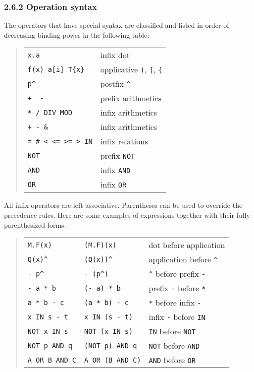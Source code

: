 \documentclass[10pt]{article}
\begin{document}
\subsubsection*{2.6.2 Operation syntax}

The operators that have special syntax are classified and listed in order of
decreasing binding power in the following table:
\begin{quote}
  \begin{tabular}{ll}
    \verb|x.a|               &    infix dot \\
    \verb|f(x) a[i] T{x}|    &    applicative \verb|(|, \verb|[|, \verb|{| \\
    \verb|p^|                &    postfix \verb|^| \\
    \verb|+  -|              &    prefix arithmetics \\
    \verb|* / DIV MOD|       &    infix arithmetics \\
    \verb|+ - &|             &    infix arithmetics \\
    \verb|= # < <= >= > IN|  &    infix relations \\
    \verb|NOT|               &    prefix \verb|NOT| \\
    \verb|AND|               &    infix \verb|AND| \\
    \verb|OR|                &    infix \verb|OR| \\
  \end{tabular}
\end{quote}

All infix operators are left associative.  Parentheses can be used to override
the precedence rules.  Here are some examples of expressions together with
their fully parenthesized forms:
\begin{quote}
  \begin{tabular}{lll}
    \verb|M.F(x)| & \verb|(M.F)(x)| & dot before application \\
    \verb|Q(x)^| & \verb|(Q(x))^| & application before \verb|^| \\
    \verb|- p^| & \verb|- (p^)| & \verb|^| before prefix \verb|-| \\
    \verb|- a * b| & \verb|(- a) * b| & prefix \verb|-| before \verb|*| \\
    \verb|a * b - c| & \verb|(a * b) - c| & \verb|*| before infix \verb|-| \\
    \verb|x IN s - t| & \verb|x IN (s - t)| & infix \verb|-| before \verb|IN| \\
    \verb|NOT x IN s| & \verb|NOT (x IN s)| & \verb|IN| before \verb|NOT| \\
    \verb|NOT p AND q| & \verb|(NOT p) AND q| & \verb|NOT| before \verb|AND| \\
    \verb|A OR B AND C| & \verb|A OR (B AND C)| & \verb|AND| before \verb|OR| \\
  \end{tabular}
\end{quote}
\end{document}
